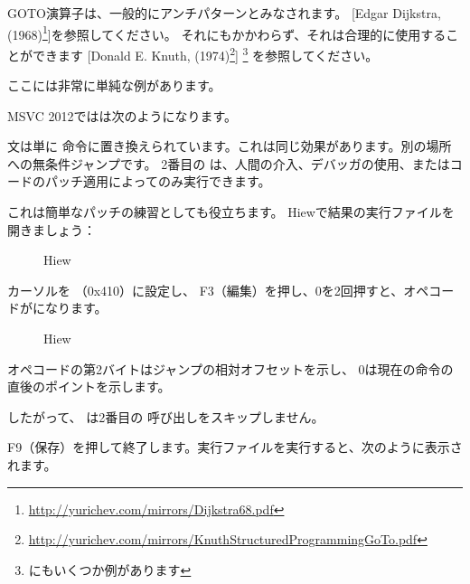 
GOTO演算子は、一般的にアンチパターンとみなされます。
[Edgar Dijkstra,  (1968)\footnote{\url{http://yurichev.com/mirrors/Dijkstra68.pdf}}]を参照してください。 
それにもかかわらず、それは合理的に使用することができます
[Donald E. Knuth,  (1974)\footnote{\url{http://yurichev.com/mirrors/KnuthStructuredProgrammingGoTo.pdf}}]
\footnote{\InSqBrackets{\CNotes} にもいくつか例があります}
を参照してください。

ここには非常に単純な例があります。



MSVC 2012ではは次のようになります。



文は単に \JMP 命令に置き換えられています。これは同じ効果があります。別の場所への無条件ジャンプです。 
2番目の \printf は、人間の介入、デバッガの使用、またはコードのパッチ適用によってのみ実行できます。

\par

\clearpage

これは簡単なパッチの練習としても役立ちます。 Hiewで結果の実行ファイルを開きましょう：

\begin{figure}[H]
\centering
{}
\caption{Hiew}
\label{fig:goto_hiew1}
\end{figure}

\clearpage
カーソルを \JMP （0x410）に設定し、
F3（編集）を押し、0を2回押すと、オペコードがになります。

\begin{figure}[H]
\centering
{}
\caption{Hiew}
\label{fig:goto_hiew2}
\end{figure}

\JMP オペコードの第2バイトはジャンプの相対オフセットを示し、
0は現在の命令の直後のポイントを示します。

したがって、 \JMP は2番目の \printf 呼び出しをスキップしません。

F9（保存）を押して終了します。実行ファイルを実行すると、次のように表示されます。



